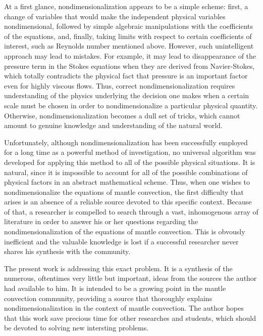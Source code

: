 \documentclass[oneside]{amsbook}
\theoremstyle{definition}
\theoremstyle{remark}
\numberwithin{section}{chapter}
\numberwithin{equation}{chapter}
\begin{document}
At a first glance, nondimensionalization appears to be a simple scheme: first, a change of variables that would make the independent physical variables nondimensional, followed by simple algebraic manipulations with the coefficients of the equations, and, finally, taking limits with respect to certain coefficients of interest, such as Reynolds number mentioned above. However, such unintelligent approach may lead to mistakes. For example, it may lead to disappearance of the pressure term in the Stokes equations when they are derived from Navier-Stokes, which totally contradicts the physical fact that pressure is an important factor even for highly viscous flows. Thus, correct nondimensionalization requires understanding of the physics underlying the decision one makes when a certain scale must be chosen in order to nondimensionalize a particular physical quantity. Otherwise, nondimensionalization becomes a dull set of tricks, which cannot amount to genuine knowledge and understanding of the natural world. 

Unfortunately, although nondimensionalization has been successfully employed for a long time as a powerful method of investigation, no universal algorithm was developed for applying this method to all of the possible physical situations. It is natural, since it is impossible to account for all of the possible combinations of physical factors in an abstract mathematical scheme. Thus, when one wishes to nondimensionalize the equations of mantle convection, the first difficulty that arises is an absence of a reliable source devoted to this specific context. Because of that, a researcher is compelled to search through a vast, inhomogenous array of literature in order to answer his or her questions regarding the nondimensionalization of the equations of mantle convection. This is obvously inefficient and the valuable knowledge is lost if a successful researcher never shares his synthesis with the community.

The present work is addressing this exact problem. It is a synthesis of the numerous, oftentimes very little but important, ideas from the sources the author had available to him. It is intended to be a growing point in the mantle convection community, providing a source that thoroughly explains nondimensionalization in the context of mantle convection. The author hopes that this work save precious time for other researches and students, which should be devoted to solving new intersting problems. 
\end{document}

